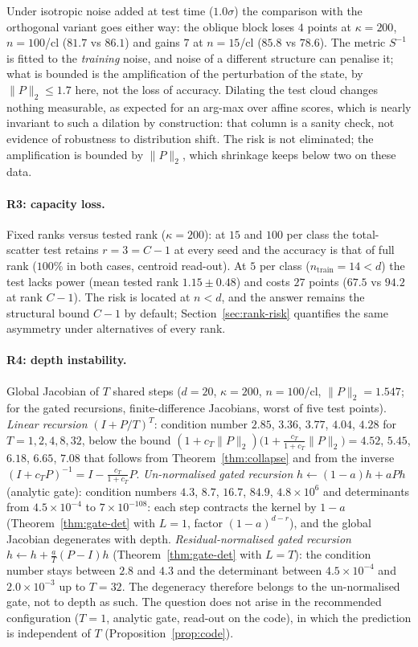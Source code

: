 \documentclass[11pt,a4paper]{article}
\theoremstyle{plain}
\theoremstyle{definition}
\theoremstyle{remark}
\begin{document}
Under isotropic noise added at test time ($1.0\sigma$) the comparison with
the orthogonal variant goes either way: the oblique block loses $4$ points
at $\kappa=200$, $n=100$/cl ($81.7$ vs $86.1$) and gains $7$ at $n=15$/cl
($85.8$ vs $78.6$). The metric $S^{-1}$ is fitted to the \emph{training}
noise, and noise of a different structure can penalise it; what is bounded
is the amplification of the perturbation of the state, by
$\|P\|_2\le1.7$ here, not the loss of accuracy. Dilating the test cloud
changes nothing measurable, as expected for an arg-max over affine scores,
which is nearly invariant to such a dilation by construction: that column
is a sanity check, not evidence of robustness to distribution shift. The
risk is not eliminated; the amplification is bounded by $\|P\|_2$, which
shrinkage keeps below two on these data.

\paragraph{R3: capacity loss.} Fixed ranks versus tested rank ($\kappa=200$):
at $15$ and $100$ per class the total-scatter test retains $r=3=C-1$ at
every seed and the accuracy is that of full rank ($100\%$ in both cases,
centroid read-out). At $5$ per class ($n_{\mathrm{train}}=14<d$) the test
lacks power (mean tested rank $1.15\pm0.48$) and costs $27$ points ($67.5$
vs $94.2$ at rank $C-1$).
The risk is located at $n<d$, and the answer remains the structural bound
$C-1$ by default; Section~\ref{sec:rank-risk} quantifies the same asymmetry
under alternatives of every rank.

\paragraph{R4: depth instability.} Global Jacobian of $T$ shared steps
($d=20$, $\kappa=200$, $n=100$/cl, $\|P\|_2=1.547$; for the gated
recursions, finite-difference Jacobians, worst of five test points).
\emph{Linear recursion} $(I+P/T)^T$: condition number
$2.85$, $3.36$, $3.77$, $4.04$, $4.28$ for $T=1,2,4,8,32$, below the bound
$(1+c_T\|P\|_2)\bigl(1+\tfrac{c_T}{1+c_T}\|P\|_2\bigr)=4.52$, $5.45$, $6.18$, $6.65$, $7.08$ that
follows from Theorem~\ref{thm:collapse} and from the inverse
$(I+c_TP)^{-1}=I-\tfrac{c_T}{1+c_T}P$. \emph{Un-normalised gated recursion}
$h\leftarrow(1-a)h+aPh$ (analytic gate): condition numbers $4.3$, $8.7$,
$16.7$, $84.9$, $4.8\times10^{6}$ and determinants from $4.5\times10^{-4}$
to $7\times10^{-108}$: each step contracts the kernel by $1-a$
(Theorem~\ref{thm:gate-det} with $L=1$, factor $(1-a)^{d-r}$), and the
global Jacobian degenerates with depth. \emph{Residual-normalised gated
recursion} $h\leftarrow h+\tfrac aT(P-I)h$ (Theorem~\ref{thm:gate-det} with
$L=T$): the condition number stays between $2.8$ and $4.3$ and the
determinant between $4.5\times10^{-4}$ and $2.0\times10^{-3}$ up to $T=32$.
The degeneracy therefore belongs to the un-normalised gate, not to depth as
such. The question does not arise in the recommended configuration
($T=1$, analytic gate, read-out on the code), in which the prediction is
independent of $T$ (Proposition~\ref{prop:code}).
\end{document}
